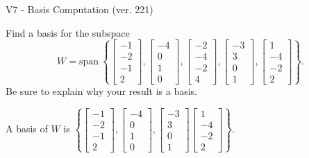 \begin{exercise}
  \begin{exerciseTitle}V7 - Basis Computation (ver. 221)\end{exerciseTitle}
  \begin{exerciseStatement}
    Find a basis for the subspace 
\[W=\mathrm{span}\ \left\{\left[\begin{array}{r}
-1 \\
-2 \\
-1 \\
2
\end{array}\right] , \left[\begin{array}{r}
-4 \\
0 \\
1 \\
0
\end{array}\right] , \left[\begin{array}{r}
-2 \\
-4 \\
-2 \\
4
\end{array}\right] , \left[\begin{array}{r}
-3 \\
3 \\
0 \\
1
\end{array}\right] , \left[\begin{array}{r}
1 \\
-4 \\
-2 \\
2
\end{array}\right]\right\}.\]
 Be sure to explain why your result is a basis.


  \end{exerciseStatement}
  \begin{exerciseAnswer}
   A basis of \(W\) is  \(\left\{\left[\begin{array}{r}
-1 \\
-2 \\
-1 \\
2
\end{array}\right] , \left[\begin{array}{r}
-4 \\
0 \\
1 \\
0
\end{array}\right] , \left[\begin{array}{r}
-3 \\
3 \\
0 \\
1
\end{array}\right] \left[\begin{array}{r}
1 \\
-4 \\
-2 \\
2
\end{array}\right]\right\}\).
  


  \end{exerciseAnswer}
\end{exercise}